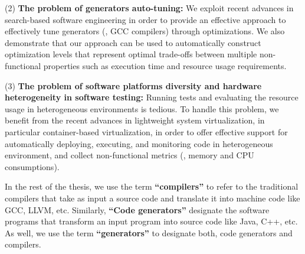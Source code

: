 	(2) \textbf{The problem of generators auto-tuning:}  
	We exploit recent advances in search-based software engineering in order to provide an effective approach to effectively tune generators (\eg, GCC compilers) through optimizations. We also demonstrate that our approach can be used to automatically construct optimization levels that represent optimal trade-offs between multiple non-functional properties such as execution time and resource usage requirements. 

	(3) \textbf{The problem of software platforms diversity and hardware heterogeneity in software testing:} Running tests and evaluating the resource usage in heterogeneous environments is tedious. To handle this problem, we benefit from the recent advances in lightweight system virtualization, in particular container-based virtualization, in order to offer effective support for automatically deploying, executing, and monitoring code in heterogeneous environment, and collect non-functional metrics (\eg, memory and CPU consumptions).
	

In the rest of the thesis, we use the term \textbf{``compilers''} to refer to the traditional compilers that take as input a source code and translate it into machine code like GCC, LLVM, etc. Similarly, \textbf{``Code generators''} designate the software programs that transform an input program into source code like Java, C++, etc. As well, we use the term \textbf{``generators''} to designate both, code generators and compilers. 

